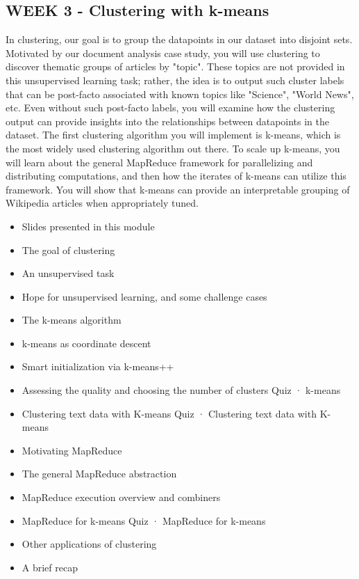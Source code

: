 \subsection{WEEK 3 - Clustering with k-means}
In clustering, our goal is to group the datapoints in our dataset into disjoint sets. Motivated by our document analysis case study, you will use clustering to discover thematic groups of articles by "topic". These topics are not provided in this unsupervised learning task; rather, the idea is to output such cluster labels that can be post-facto associated with known topics like "Science", "World News", etc. Even without such post-facto labels, you will examine how the clustering output can provide insights into the relationships between datapoints in the dataset. The first clustering algorithm you will implement is k-means, which is the most widely used clustering algorithm out there. To scale up k-means, you will learn about the general MapReduce framework for parallelizing and distributing computations, and then how the iterates of k-means can utilize this framework. You will show that k-means can provide an interpretable grouping of Wikipedia articles when appropriately tuned.
\begin{itemize}
\item Slides presented in this module
\item The goal of clustering
\item An unsupervised task
\item Hope for unsupervised learning, and some challenge cases
\item The k-means algorithm
\item k-means as coordinate descent
\item Smart initialization via k-means++
\item Assessing the quality and choosing the number of clusters
Quiz · k-means
\item Clustering text data with K-means
Quiz · Clustering text data with K-means
\item Motivating MapReduce
\item The general MapReduce abstraction
\item MapReduce execution overview and combiners
\item MapReduce for k-means
Quiz · MapReduce for k-means
\item Other applications of clustering
\item A brief recap
\end{itemize}
\newpage
